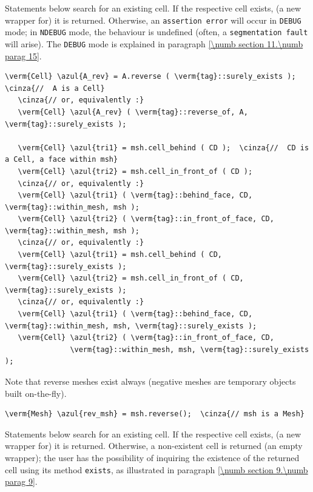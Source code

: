 Statements below search for an existing cell.
If the respective cell exists, (a new wrapper for) it is returned.
Otherwise, an {\small\tt assertion error} will occur in {\small\tt DEBUG} mode;
in {\small\tt NDEBUG} mode, the behaviour is undefined (often, a {\small\tt segmentation fault}
will arise).
The {\small\tt DEBUG} mode is explained in paragraph \ref{\numb section 11.\numb parag 15}.

\begin{Verbatim}[commandchars=\\\{\},formatcom=\small\tt,
   baselinestretch=0.94,framesep=2mm                      ]
   \verm{Cell} \azul{A_rev} = A.reverse ( \verm{tag}::surely_exists );  \cinza{//  A is a Cell}
   \cinza{// or, equivalently :}
   \verm{Cell} \azul{A_rev} ( \verm{tag}::reverse_of, A, \verm{tag}::surely_exists );

   \verm{Cell} \azul{tri1} = msh.cell_behind ( CD );  \cinza{//  CD is a Cell, a face within msh}
   \verm{Cell} \azul{tri2} = msh.cell_in_front_of ( CD );
   \cinza{// or, equivalently :}
   \verm{Cell} \azul{tri1} ( \verm{tag}::behind_face, CD, \verm{tag}::within_mesh, msh );
   \verm{Cell} \azul{tri2} ( \verm{tag}::in_front_of_face, CD, \verm{tag}::within_mesh, msh );
   \cinza{// or, equivalently :}
   \verm{Cell} \azul{tri1} = msh.cell_behind ( CD, \verm{tag}::surely_exists );
   \verm{Cell} \azul{tri2} = msh.cell_in_front_of ( CD, \verm{tag}::surely_exists );
   \cinza{// or, equivalently :}
   \verm{Cell} \azul{tri1} ( \verm{tag}::behind_face, CD, \verm{tag}::within_mesh, msh, \verm{tag}::surely_exists );
   \verm{Cell} \azul{tri2} ( \verm{tag}::in_front_of_face, CD,
               \verm{tag}::within_mesh, msh, \verm{tag}::surely_exists );
\end{Verbatim}

Note that reverse meshes exist always (negative meshes are temporary objects built
on-the-fly).

\begin{Verbatim}[commandchars=\\\{\},formatcom=\small\tt,
   baselinestretch=0.94,framesep=2mm                      ]
   \verm{Mesh} \azul{rev_msh} = msh.reverse();  \cinza{// msh is a Mesh}
\end{Verbatim}

Statements below search for an existing cell.
If the respective cell exists, (a new wrapper for) it is returned.
Otherwise, a non-existent cell is returned
(an empty wrapper); the user has the possibility of inquiring the existence
of the returned cell using its method {\small\tt exists}, as illustrated in paragraph
\ref{\numb section 9.\numb parag 9}.

